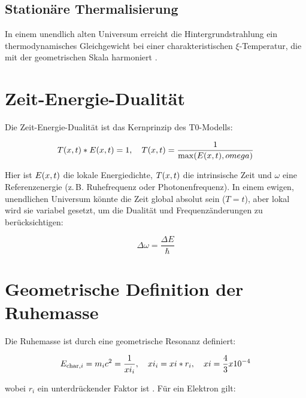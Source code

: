 \documentclass[12pt,a4paper]{report}
\begin{document}
\subsection{Stationäre Thermalisierung}
\label{subsec:thermalisierung}

In einem unendlich alten Universum erreicht die Hintergrundstrahlung ein thermodynamisches Gleichgewicht bei einer charakteristischen \(\xi\)-Temperatur, die mit der geometrischen Skala harmoniert \cite{pascher_t0_cmb_2025}.

\section{Zeit-Energie-Dualität}
\label{sec:zeit_energie_dualitaet}

Die Zeit-Energie-Dualität ist das Kernprinzip des T0-Modells:

\begin{equation}
	T(x,t) * E(x,t) = 1, \quad T(x,t) = \frac{1}{\max(E(x,t), omega)}
	\label{eq:zeit_energie_dualitaet}
\end{equation}

Hier ist \(E(x,t)\) die lokale Energiedichte, \(T(x,t)\) die intrinsische Zeit und \(\omega\) eine Referenzenergie (z.\,B. Ruhefrequenz oder Photonenfrequenz). In einem ewigen, unendlichen Universum könnte die Zeit global absolut sein (\( T = t \)), aber lokal wird sie variabel gesetzt, um die Dualität und Frequenzänderungen zu berücksichtigen:

\begin{equation}
	\Delta \omega = \frac{\Delta E}{\hbar}
	\label{eq:frequenz_aenderung}
\end{equation}

\section{Geometrische Definition der Ruhemasse}
\label{sec:geometrische_ruhemasse}

Die Ruhemasse ist durch eine geometrische Resonanz definiert:

\begin{equation}
	E_{\text{char},i} = m_i c^2 = \frac{1}{xi_i}, \quad xi_i = xi * r_i, \quad xi = \frac{4}{3} x 10^{-4}
	\label{eq:ruhemasse_definition}
\end{equation}

wobei \(r_i\) ein unterdrückender Faktor ist \cite{pascher_t0_energie_2025}. Für ein Elektron gilt:
\end{document}
